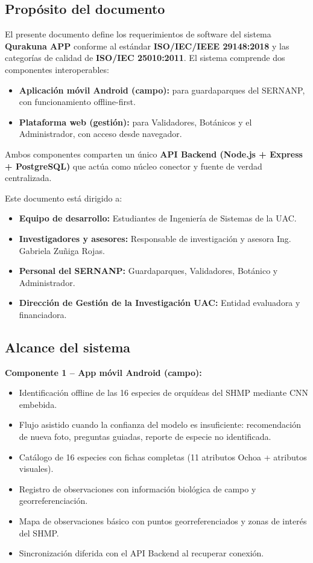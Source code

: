 \documentclass[12pt, a4paper]{article}
\begin{document}
\subsection{Prop\'osito del documento}

El presente documento define los requerimientos de software del sistema \textbf{Qurakuna APP} conforme al est\'andar \textbf{ISO/IEC/IEEE 29148:2018} y las categor\'ias de calidad de \textbf{ISO/IEC 25010:2011}. El sistema comprende dos componentes interoperables:

\begin{itemize}
  \item \textbf{Aplicaci\'on m\'ovil Android (campo):} para guardaparques del SERNANP, con funcionamiento offline-first.
  \item \textbf{Plataforma web (gesti\'on):} para Validadores, Bot\'anicos y el Administrador, con acceso desde navegador.
\end{itemize}

Ambos componentes comparten un \'unico \textbf{API Backend (Node.js + Express + PostgreSQL)} que act\'ua como n\'ucleo conector y fuente de verdad centralizada.

Este documento est\'a dirigido a:
\begin{itemize}
  \item \textbf{Equipo de desarrollo:} Estudiantes de Ingenier\'ia de Sistemas de la UAC.
  \item \textbf{Investigadores y asesores:} Responsable de investigaci\'on y asesora Ing. Gabriela Zu\~niga Rojas.
  \item \textbf{Personal del SERNANP:} Guardaparques, Validadores, Bot\'anico y Administrador.
  \item \textbf{Direcci\'on de Gesti\'on de la Investigaci\'on UAC:} Entidad evaluadora y financiadora.
\end{itemize}

\subsection{Alcance del sistema}

\textbf{Componente 1 -- App m\'ovil Android (campo):}
\begin{itemize}
  \item Identificaci\'on offline de las 16 especies de orqu\'ideas del SHMP mediante CNN embebida.
  \item Flujo asistido cuando la confianza del modelo es insuficiente: recomendaci\'on de nueva foto, preguntas guiadas, reporte de especie no identificada.
  \item Cat\'alogo de 16 especies con fichas completas (11 atributos Ochoa + atributos visuales).
  \item Registro de observaciones con informaci\'on biol\'ogica de campo y georreferenciaci\'on.
  \item Mapa de observaciones b\'asico con puntos georreferenciados y zonas de inter\'es del SHMP.
  \item Sincronizaci\'on diferida con el API Backend al recuperar conexi\'on.
\end{itemize}
\end{document}
